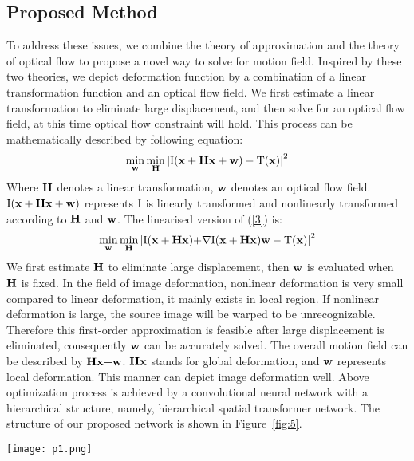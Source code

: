 \documentclass{article}
\begin{document}
\subsection{Proposed Method}
To address these issues, we combine the theory of approximation and the theory of optical flow to propose a novel way to solve for motion field.
Inspired by these two theories, we depict deformation function by a combination of a linear transformation function and an optical flow field.
We first estimate a linear transformation to eliminate large displacement, and then solve for an optical flow field, at this time optical flow constraint will hold.
This process can be mathematically described by following equation:
\begin{equation}\label{3}
\mathop {\min }\limits_{\bf{w}} \mathop {\min }\limits_{\bf{H}} {\left| {{\rm{I}}({\bf{x}} + {\bf{Hx}} + {\bf{w}}) - {\rm{T}}({\bf{x}})} \right|^2}
\end{equation}
Where ${\bf{H}}$ denotes a linear transformation, ${\bf{w}}$ denotes an optical flow field.
${{\rm{I}}({\bf{x}} + {\bf{Hx}} + {\bf{w}})}$ represents ${\rm{I}}$ is linearly transformed and nonlinearly transformed according to ${\bf{H}}$ and ${\bf{w}}$.
The linearised version of (\ref{3}) is:
\begin{equation}\label{4}
\mathop {\min }\limits_{\bf{w}} \mathop {\min }\limits_{\bf{H}} {\left| {{\rm{I}}({\bf{x}} + {\bf{Hx}}){\rm{ + }}\nabla {\rm{I}}({\bf{x}} + {\bf{Hx}}){\bf{w}} - {\rm{T}}({\bf{x}})} \right|^2}
\end{equation}
We first estimate ${\bf{H}}$ to eliminate large displacement, then ${\bf{w}}$ is evaluated when ${\bf{H}}$ is fixed.
In the field of image deformation, nonlinear deformation is very small compared to linear deformation, it mainly exists in local region.
If nonlinear deformation is large, the source image will be warped to be unrecognizable.
Therefore this first-order approximation is feasible after large displacement is eliminated, consequently ${\bf{w}}$ can be accurately solved.
The overall motion field can be described by ${\bf{Hx}}{\rm{ + }}{\bf{w}}$.
${\bf{Hx}}$ stands for global deformation, and ${\bf{w}}$ represents local deformation.
This manner can depict image deformation well.
Above optimization process is achieved by a convolutional neural network with a hierarchical structure, namely, hierarchical spatial transformer network.
The structure of our proposed network is shown in Figure~\ref{fig:5}.

\begin{figure*}[t]
    \centering
    \texttt{[image: p1.png]}
    \caption{\label{fig:5}The architecture of HSTN.
    It consists of 4 modules: linear transformation, converter, optical flow field generator and sampler.
    The filter sizes of all the convolutional layers are all $3 \times 3$.
    The filter number of all the convolutional layers doubles after each downsampling layer and halves after each deconvolutional layer.
    All the downsampling layers and deconvolutional layers have a stride of 2.
    The bottleneck layer is a convolutional layer with a filter size of $1 \times 1$.}
\end{figure*}
\end{document}
